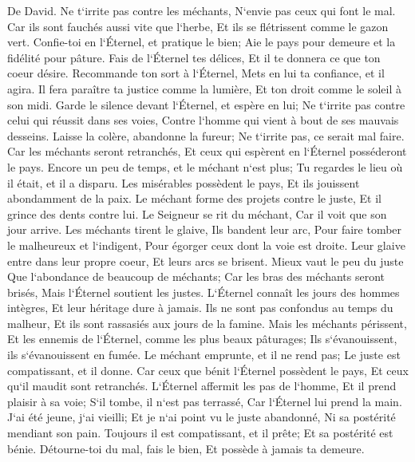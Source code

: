 \verse De David. Ne t`irrite pas contre les méchants, N`envie pas ceux qui font le mal. 
\verse Car ils sont fauchés aussi vite que l`herbe, Et ils se flétrissent comme le gazon vert. 
\verse Confie-toi en l`Éternel, et pratique le bien; Aie le pays pour demeure et la fidélité pour pâture. 
\verse Fais de l`Éternel tes délices, Et il te donnera ce que ton coeur désire. 
\verse Recommande ton sort à l`Éternel, Mets en lui ta confiance, et il agira. 
\verse Il fera paraître ta justice comme la lumière, Et ton droit comme le soleil à son midi. 
\verse Garde le silence devant l`Éternel, et espère en lui; Ne t`irrite pas contre celui qui réussit dans ses voies, Contre l`homme qui vient à bout de ses mauvais desseins. 
\verse Laisse la colère, abandonne la fureur; Ne t`irrite pas, ce serait mal faire. 
\verse Car les méchants seront retranchés, Et ceux qui espèrent en l`Éternel posséderont le pays. 
\verse Encore un peu de temps, et le méchant n`est plus; Tu regardes le lieu où il était, et il a disparu. 
\verse Les misérables possèdent le pays, Et ils jouissent abondamment de la paix. 
\verse Le méchant forme des projets contre le juste, Et il grince des dents contre lui. 
\verse Le Seigneur se rit du méchant, Car il voit que son jour arrive. 
\verse Les méchants tirent le glaive, Ils bandent leur arc, Pour faire tomber le malheureux et l`indigent, Pour égorger ceux dont la voie est droite. 
\verse Leur glaive entre dans leur propre coeur, Et leurs arcs se brisent. 
\verse Mieux vaut le peu du juste Que l`abondance de beaucoup de méchants; 
\verse Car les bras des méchants seront brisés, Mais l`Éternel soutient les justes. 
\verse L`Éternel connaît les jours des hommes intègres, Et leur héritage dure à jamais. 
\verse Ils ne sont pas confondus au temps du malheur, Et ils sont rassasiés aux jours de la famine. 
\verse Mais les méchants périssent, Et les ennemis de l`Éternel, comme les plus beaux pâturages; Ils s`évanouissent, ils s`évanouissent en fumée. 
\verse Le méchant emprunte, et il ne rend pas; Le juste est compatissant, et il donne. 
\verse Car ceux que bénit l`Éternel possèdent le pays, Et ceux qu`il maudit sont retranchés. 
\verse L`Éternel affermit les pas de l`homme, Et il prend plaisir à sa voie; 
\verse S`il tombe, il n`est pas terrassé, Car l`Éternel lui prend la main. 
\verse J`ai été jeune, j`ai vieilli; Et je n`ai point vu le juste abandonné, Ni sa postérité mendiant son pain. 
\verse Toujours il est compatissant, et il prête; Et sa postérité est bénie. 
\verse Détourne-toi du mal, fais le bien, Et possède à jamais ta demeure. 
